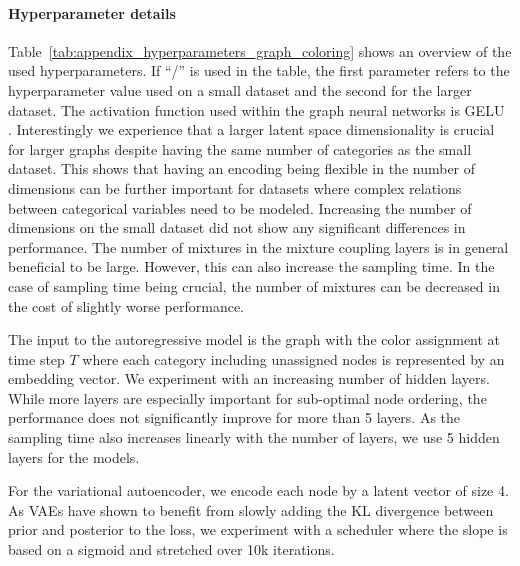 \paragraph{Hyperparameter details} Table~\ref{tab:appendix_hyperparameters_graph_coloring} shows an overview of the used hyperparameters. If ``/'' is used in the table, the first parameter refers to the hyperparameter value used on a small dataset and the second for the larger dataset. The activation function used within the graph neural networks is GELU \cite{GELU}. Interestingly we experience that a larger latent space dimensionality is crucial for larger graphs despite having the same number of categories as the small dataset. This shows that having an encoding being flexible in the number of dimensions can be further important for datasets where complex relations between categorical variables need to be modeled. Increasing the number of dimensions on the small dataset did not show any significant differences in performance. 
The number of mixtures in the mixture coupling layers is in general beneficial to be large. However, this can also increase the sampling time. In the case of sampling time being crucial, the number of mixtures can be decreased in the cost of slightly worse performance.

The input to the autoregressive model is the graph with the color assignment at time step $T$ where each category including unassigned nodes is represented by an embedding vector. We experiment with an increasing number of hidden layers. While more layers are especially important for sub-optimal node ordering, the performance does not significantly improve for more than 5 layers. As the sampling time also increases linearly with the number of layers, we use 5 hidden layers for the models.

For the variational autoencoder, we encode each node by a latent vector of size 4. As VAEs have shown to benefit from slowly adding the KL divergence between prior and posterior to the loss, we experiment with a scheduler where the slope is based on a sigmoid and stretched over 10k iterations. 

